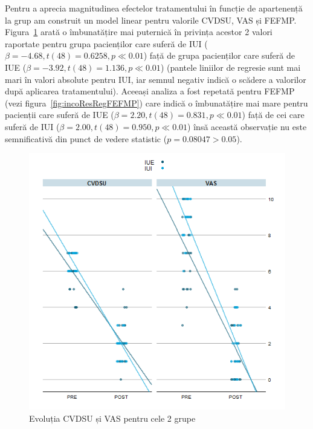 \documentclass[12pt]{article}
\begin{document}
Pentru a aprecia magnitudinea efectelor tratamentului în funcție de apartenență la grup am construit un model linear pentru valorile \ac{CVDSU}, \ac{VAS} și \ac{FEFMP}. Figura~\ref{fig:incoResRegGrp} arată o îmbunatățire mai puternică în privința acestor 2 valori raportate pentru grupa pacienților care suferă de \ac{IUI} ($\beta=-4.68, t(48)=0.6258, p\ll0.01$) față de grupa pacienților care suferă de \ac{IUE} ($\beta=-3.92, t(48)=1.136, p\ll0.01$) (pantele liniilor de regresie sunt mai mari în valori absolute pentru \ac{IUI}, iar semnul negativ indică o scădere a valorilor după aplicarea tratamentului). Aceeași analiza a fost repetată pentru \ac{FEFMP} (vezi figura~\ref{fig:incoResRegFEFMP}) care indică o îmbunatățire mai mare pentru pacienții care suferă de \ac{IUE} ($\beta=2.20, t(48)=0.831, p\ll0.01$) față de cei care suferă de \ac{IUI} ($\beta=2.00, t(48)=0.950, p\ll0.01$) însă această observație nu este semnificativă din punct de vedere statistic ($p=0.08047>0.05$).
  \begin{figure}[H]
    \centering
    \includegraphics[width=0.8\linewidth]{incoResRegGrp}
    \caption{Evoluția \acf{CVDSU} și \acf{VAS} pentru cele 2 grupe}
    \label{fig:incoResRegGrp}
  \end{figure}
\end{document}
